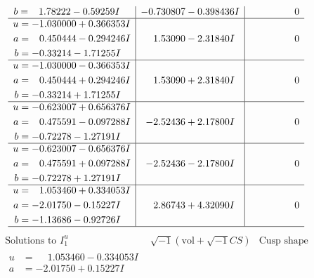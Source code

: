\documentclass[1p]{elsarticle_modified}
\theoremstyle{definition}
\newcommand{\I}{\sqrt{-1}}
\begin{document}
$$\begin{array}{c|c|c}
\begin{aligned}
b &= \phantom{-}1.78222 - 0.59259 I\end{aligned}
 & -0.730807 - 0.398436 I & \phantom{-0.000000 } 0 \\ \hline\begin{aligned}
u &= -1.030000 + 0.366353 I \\
a &= \phantom{-}0.450444 - 0.294246 I \\
b &= -0.33214 - 1.71255 I\end{aligned}
 & \phantom{-}1.53090 - 2.31840 I & \phantom{-0.000000 } 0 \\ \hline\begin{aligned}
u &= -1.030000 - 0.366353 I \\
a &= \phantom{-}0.450444 + 0.294246 I \\
b &= -0.33214 + 1.71255 I\end{aligned}
 & \phantom{-}1.53090 + 2.31840 I & \phantom{-0.000000 } 0 \\ \hline\begin{aligned}
u &= -0.623007 + 0.656376 I \\
a &= \phantom{-}0.475591 - 0.097288 I \\
b &= -0.72278 - 1.27191 I\end{aligned}
 & -2.52436 + 2.17800 I & \phantom{-0.000000 } 0 \\ \hline\begin{aligned}
u &= -0.623007 - 0.656376 I \\
a &= \phantom{-}0.475591 + 0.097288 I \\
b &= -0.72278 + 1.27191 I\end{aligned}
 & -2.52436 - 2.17800 I & \phantom{-0.000000 } 0 \\ \hline\begin{aligned}
u &= \phantom{-}1.053460 + 0.334053 I \\
a &= -2.01750 - 0.15227 I \\
b &= -1.13686 - 0.92726 I\end{aligned}
 & \phantom{-}2.86743 + 4.32090 I & \phantom{-0.000000 } 0\\
 \hline 
 \end{array}$$\newpage$$\begin{array}{c|c|c}  
\text{Solutions to }I^u_{1}& \I (\text{vol} + \sqrt{-1}CS) & \text{Cusp shape}\\
 \hline 
\begin{aligned}
u &= \phantom{-}1.053460 - 0.334053 I \\
a &= -2.01750 + 0.15227 I \\

\end{aligned}
\end{array}$$
\end{document}
